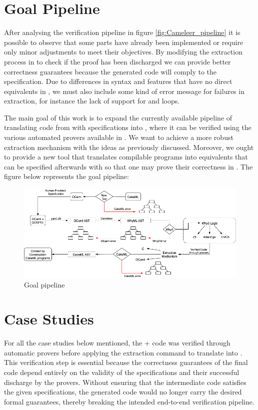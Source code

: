 \section{Goal Pipeline}

After analysing the verification pipeline in figure \ref{fig:Cameleer_pipeline} it is possible to observe that some parts have already been 
implemented or require only minor adjustments to meet their objectives. By modifying the extraction process in \whythree to check if the 
proof has been discharged we can provide better correctness guarantees because the generated \cml code will comply to the specification. 
Due to differences in syntax and features that have no direct equivalents in \cml, we must also include some kind of error message for 
failures in extraction, for instance the lack of support for  and  loops.

The main goal of this work is to expand the currently available pipeline of translating code from \ocaml with \gospel specifications 
into \whyml, where it can be verified using the various automated provers available in \whythree. We want to achieve 
a more robust extraction mechanism with the ideas as previously discussed. Moreover, we ought to provide a new tool that 
translates compilable \cml programs into \ocaml equivalents that can be specified afterwards with \gospel so that one may prove 
their correctness in \cameleer. The figure below represents the goal pipeline:

\begin{figure}[H]
    \centering
    \includegraphics[width=\linewidth]{images/Goal_Pipeline.png}
    \caption{Goal pipeline}
\end{figure}

\section{Case Studies}

For all the case studies below mentioned, the \ocaml + \gospel code was verified through \whythree automatic
provers before applying the extraction command to translate into \cml. This verification step is essential because the correctness 
guarantees of the final \cml code depend entirely on the validity of the specifications and their successful discharge by the 
provers. Without ensuring that the \whyml intermediate code satisfies the given specifications, the generated \cml code would 
no longer carry the desired formal guarantees, thereby breaking the intended end-to-end verification pipeline.

